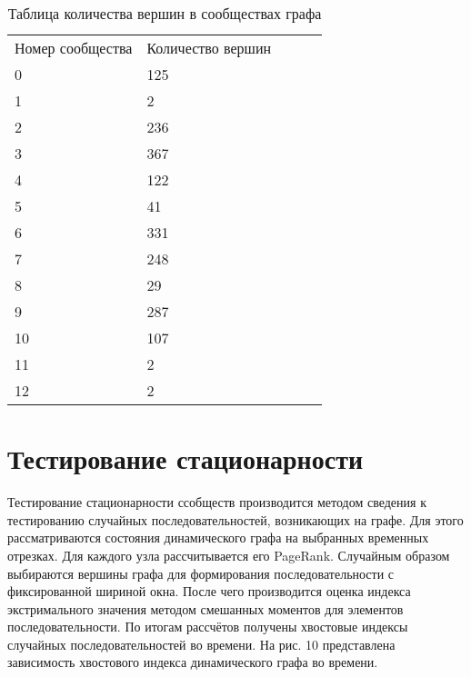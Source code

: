 \documentclass[a4paper,12pt]{article}
\begin{document}
\begin{table}[h!]
\begin{tabular}{|l|l|lll}
\cline{1-2}
Номер сообщества & Количество вершин &  &  &  \\ \cline{1-2}
0                & 125               &  &  &  \\ \cline{1-2}
1                & 2                 &  &  &  \\ \cline{1-2}
2                & 236               &  &  &  \\ \cline{1-2}
3                & 367               &  &  &  \\ \cline{1-2}
4                & 122               &  &  &  \\ \cline{1-2}
5                & 41                &  &  &  \\ \cline{1-2}
6                & 331               &  &  &  \\ \cline{1-2}
7                & 248               &  &  &  \\ \cline{1-2}
8                & 29                &  &  &  \\ \cline{1-2}
9                & 287               &  &  &  \\ \cline{1-2}
10               & 107               &  &  &  \\ \cline{1-2}
11               & 2                 &  &  &  \\ \cline{1-2}
12               & 2                 &  &  &  \\ \cline{1-2}

\end{tabular}
\caption {Таблица количества вершин в сообществах графа}
\end{table}




\section{Тестирование стационарности}

Тестирование стационарности ссобществ производится методом сведения к тестированию случайных последовательностей, возникающих на графе. Для этого рассматриваются состояния динамического графа на выбранных временных отрезках. Для каждого узла рассчитывается его PageRank. Случайным образом выбираются вершины графа для формирования последовательности с фиксированной шириной окна. После чего производится оценка индекса экстримального значения методом смешанных моментов для элементов последовательности. По итогам рассчётов получены хвостовые индексы случайных последовательностей во времени. 
На рис. 10 представлена зависимость хвостового индекса динамического графа во времени.
\end{document}

